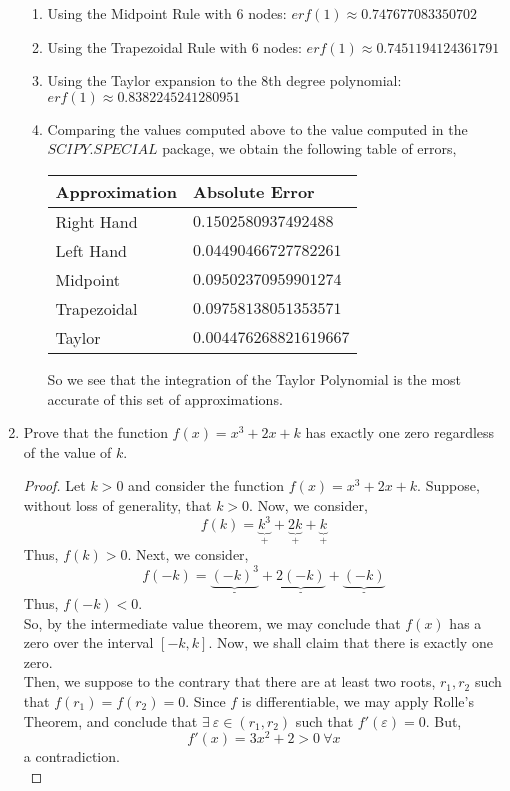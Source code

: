 \documentclass[letterpaper,10pt]{article}
\begin{document}
\begin{enumerate}
\begin{enumerate}
\item Using the Midpoint Rule with 6 nodes: $erf(1)\approx 0.747677083350702$
\item Using the Trapezoidal Rule with 6 nodes: $erf(1)\approx 0.7451194124361791$
\item Using the Taylor expansion to the 8th degree polynomial: $erf(1)\approx 0.8382245241280951$
\item Comparing the values computed above to the value computed in the $SCIPY.SPECIAL$ package, we obtain the following table of errors,\\
\begin{center}
\begin{tabular}{|l|l|}
\hline
Approximation & Absolute Error \\\hline
Right Hand & $0.1502580937492488$ \\
Left Hand & $0.04490466727782261$ \\
Midpoint & $0.09502370959901274$ \\
Trapezoidal & $0.09758138051353571$ \\
Taylor & $0.004476268821619667$ \\\hline
\end{tabular}
\end{center}
So we see that the integration of the Taylor Polynomial is the most accurate of this set of approximations.
\end{enumerate}
\item Prove that the function $f(x)=x^3+2x+k$ has exactly one zero regardless of the value of $k$.
\begin{proof}
Let $k>0$ and consider the function $f(x)=x^3+2x+k$. Suppose, without loss of generality, that $k>0$. Now, we consider,
\[f(k)=\underbrace{k^3}_{\text{+}}+\underbrace{2k}_{\text{+}}+\underbrace{k}_{\text{+}}\]
Thus, $f(k)>0$. Next, we consider,
\[f(-k)=\underbrace{(-k)^3}_{\text{-}}+\underbrace{2(-k)}_{\text{-}}+\underbrace{(-k)}_{\text{-}}\]
Thus, $f(-k)<0$.\\
So, by the intermediate value theorem, we may conclude that $f(x)$ has a zero over the interval $[-k,k]$. Now, we shall claim that there is exactly one zero.\\
Then, we suppose to the contrary that there are at least two roots, $r_1,r_2$ such that $f(r_1)=f(r_2)=0$. Since $f$ is differentiable, we may apply Rolle's Theorem, and conclude that $\exists\ \varepsilon\in(r_1,r_2)$ such that $f'(\varepsilon)=0$. But,
\[f'(x)=3x^2+2>0\ \forall x\]
a contradiction.\\

\end{proof}
\end{enumerate}
\end{document}
